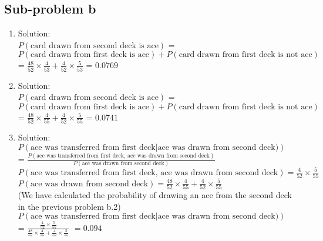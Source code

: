   \subsection*{Sub-problem b}
  \begin{enumerate}
  \item Solution:\\
  $P(\text{card drawn from second deck is ace})$ = \\
  $P(\text{card drawn from first deck is ace}) 
  + P(\text{card drawn from first deck is not ace})$\\
  = $\frac{48}{52}\times\frac{4}{53} + \frac{4}{52}\times\frac{5}{53}$
  = $0.0769$
  \item Solution:\\
  $P(\text{card drawn from second deck is ace})$ = \\
  $P(\text{card drawn from first deck is ace}) 
  +P(\text{card drawn from first deck is not ace})$\\
  = $\frac{48}{52}\times\frac{4}{55} + \frac{4}{52}\times\frac{5}{55}$
  = $0.0741$
  \item Solution:\\
  $P(\text{ace was transferred from first deck$|$ace was drawn from
  second deck)})$\\
  = $\frac{P(\text{ace was transferred from first deck, ace was drawn from
  second deck})}{P(\text{ace was drawn from second deck})}$\\
  $P(\text{ace was transferred from first deck, ace was drawn from
    second deck}) = \frac{4}{52}\times\frac{5}{55}$\\
  $P(\text{ace was drawn from second deck}) =
  \frac{48}{52}\times\frac{4}{55} + \frac{4}{52}\times\frac{5}{55}$\\
  (We have calculated the probability of drawing an ace from the
  second deck in the previous problem b.2)\\

  $P(\text{ace was transferred from first deck$|$ace was drawn from
    second deck)})$\\
  =
  $\frac{\frac{4}{52}\times\frac{5}{55}}{\frac{48}{52}\times\frac{4}{55}
  + \frac{4}{52}\times\frac{5}{55}}$
  $= 0.094$
  \end{enumerate}
  
